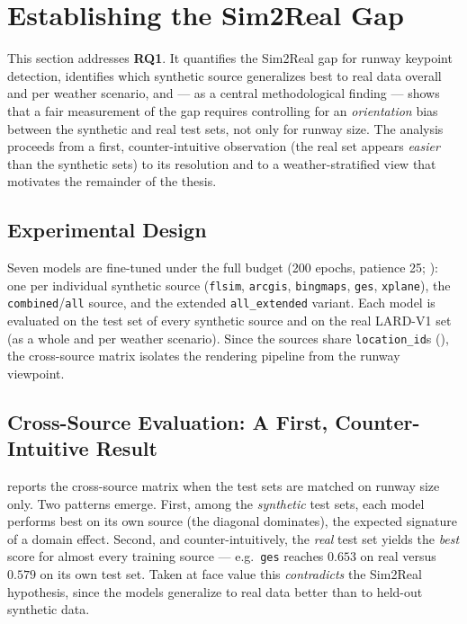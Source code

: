 \section{Establishing the Sim2Real Gap}
\label{sec:gap}

This section addresses \textbf{RQ1}. It quantifies the Sim2Real gap for runway
keypoint detection, identifies which synthetic source generalizes best to real data
overall and per weather scenario, and --- as a central methodological finding ---
shows that a fair measurement of the gap requires controlling for an
\emph{orientation} bias between the synthetic and real test sets, not only for runway
size. The analysis proceeds from a first, counter-intuitive observation (the real set
appears \emph{easier} than the synthetic sets) to its resolution and to a
weather-stratified view that motivates the remainder of the thesis.

\subsection{Experimental Design}
\label{subsec:gap-design}
Seven models are fine-tuned under the full budget (200 epochs, patience 25;
): one per individual synthetic source (\texttt{flsim},
\texttt{arcgis}, \texttt{bingmaps}, \texttt{ges}, \texttt{xplane}), the
\texttt{combined}/\texttt{all} source, and the extended \texttt{all\_extended}
variant. Each model is evaluated on the test set of every synthetic source and on the
real LARD-V1 set (as a whole and per weather scenario). Since the sources share
\texttt{location\_id}s (), the cross-source matrix isolates
the rendering pipeline from the runway viewpoint.

\subsection{Cross-Source Evaluation: A First, Counter-Intuitive Result}
\label{subsec:gap-size}
 reports the cross-source matrix when the test sets are matched on
runway size only. Two patterns emerge. First, among the \emph{synthetic} test sets,
each model performs best on its own source (the diagonal dominates), the expected
signature of a domain effect. Second, and counter-intuitively, the \emph{real} test
set yields the \emph{best} score for almost every training source --- e.g.\
\texttt{ges} reaches $0.653$ on real versus $0.579$ on its own test set. Taken at face
value this \emph{contradicts} the Sim2Real hypothesis, since the models generalize to
real data better than to held-out synthetic data.


